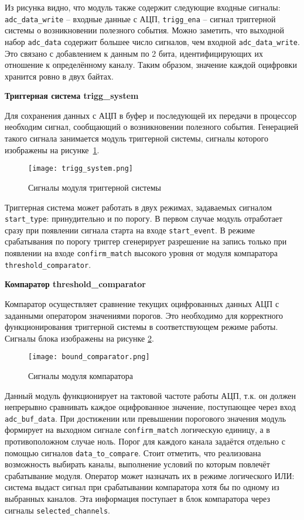 Из рисунка видно, что модуль также содержит следующие входные сигналы: \texttt{adc\_data\_write} -- входные данные с АЦП, \texttt{trigg\_ena} -- сигнал триггерной системы о возникновении полезного события. Можно заметить, что выходной набор \texttt{adc\_data} содержит большее число сигналов, чем входной \texttt{adc\_data\_write}. Это связано с добавлением к данным по 2 бита, идентифицирующих их отношение к определённому каналу. Таким образом, значение каждой оцифровки хранится ровно в двух байтах.\par
\textbf{Триггерная система trigg\_system}\par
Для сохранения данных с АЦП в буфер и последующей их передачи в процессор необходим сигнал, сообщающий о возникновении полезного события. Генерацией такого сигнала занимается модуль триггерной системы, сигналы которого изображены на рисунке~\ref{fig:trigg_system}.\par
\begin{figure}[ht]
    \centering
    \texttt{[image: trigg\_system.png]}
    \caption{Сигналы модуля триггерной системы}
    \label{fig:trigg_system}
\end{figure}
Триггерная система может работать в двух режимах, задаваемых сигналом \texttt{start\_type}: принудительно и по порогу. В первом случае модуль отработает сразу при появлении сигнала старта на входе \texttt{start\_event}. В режиме срабатывания по порогу триггер сгенерирует разрешение на запись только при появлении на входе \texttt{confirm\_match} высокого уровня от модуля компаратора \texttt{threshold\_comparator}.\par
\textbf{Компаратор threshold\_comparator}\par
Компаратор осуществляет сравнение текущих оцифрованных данных АЦП с заданными оператором значениями порогов. Это необходимо для корректного функционирования триггерной системы в соответствующем режиме работы. Сигналы блока изображены на рисунке \ref{fig:bound_comparator}.\par
\begin{figure}[ht]
    \centering
    \texttt{[image: bound\_comparator.png]}
    \caption{Сигналы модуля компаратора}
    \label{fig:bound_comparator}
\end{figure}
Данный модуль функционирует на тактовой частоте работы АЦП, т.к. он должен непрерывно сравнивать каждое оцифрованное значение, поступающее через вход \texttt{adc\_buf\_data}. При достижении или превышении порогового значения модуль формирует на выходном сигнале \texttt{confirm\_match} логическую единицу, а в противоположном случае ноль. Порог для каждого канала задаётся отдельно с помощью сигналов \texttt{data\_to\_compare}. Стоит отметить, что реализована возможность выбирать каналы, выполнение условий по которым повлечёт срабатывание модуля. Оператор может назначать их в режиме логического ИЛИ: система выдаст сигнал при срабатывании компаратора хотя бы по одному из выбранных каналов. Эта информация поступает в блок компаратора через сигналы \texttt{selected\_channels}.\par
